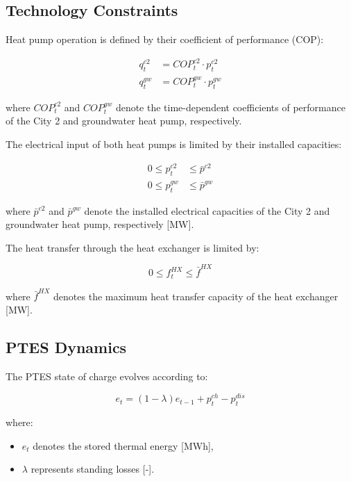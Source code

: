 \subsection{Technology Constraints}

Heat pump operation is defined by their coefficient of performance (COP):

\begin{align}
q^{c2}_{t} &= COP^{c2}_{t} \cdot p^{c2}_{t} \\
q^{gw}_{t} &= COP^{gw}_{t} \cdot p^{gw}_{t}
\end{align}

where \(COP^{c2}_{t}\) and \(COP^{gw}_{t}\) denote the time-dependent coefficients of performance of the City 2 and groundwater heat pump, respectively.

The electrical input of both heat pumps is limited by their installed capacities:

\begin{align}
0 \le p^{c2}_{t} &\le \bar{p}^{c2} \\
0 \le p^{gw}_{t} &\le \bar{p}^{gw}
\end{align}

where \(\bar{p}^{c2}\) and \(\bar{p}^{gw}\) denote the installed electrical capacities of the City 2 and groundwater heat pump, respectively [MW].

The heat transfer through the heat exchanger is limited by:

\begin{equation}
0 \le f^{HX}_{t} \le \bar{f}^{HX}
\end{equation}

where \(\bar{f}^{HX}\) denotes the maximum heat transfer capacity of the heat exchanger [MW].

\subsection{PTES Dynamics}

The PTES state of charge evolves according to:

\begin{equation}
e_t = (1-\lambda)e_{t-1} + p^{ch}_{t} - p^{dis}_{t}
\end{equation}

where:
\begin{itemize}
    \item \(e_t\) denotes the stored thermal energy [MWh],
    \item \(\lambda\) represents standing losses [-].
\end{itemize}

